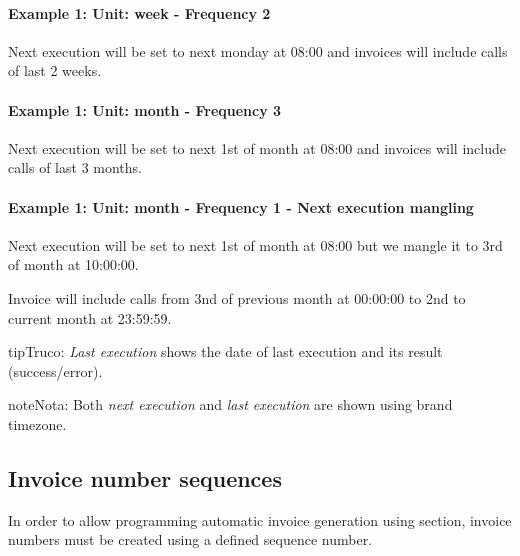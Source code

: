 \documentclass[letterpaper,10pt,spanish]{sphinxmanual}
\begin{document}
\paragraph{Example 1: Unit: week - Frequency 2}

Next execution will be set to next monday at 08:00 and invoices will include calls of last 2 weeks.
\paragraph{Example 1: Unit: month - Frequency 3}

Next execution will be set to next 1st of month at 08:00 and invoices will include calls of last 3 months.
\paragraph{Example 1: Unit: month - Frequency 1 - Next execution mangling}

Next execution will be set to next 1st of month at 08:00 but we mangle it to 3rd of month at 10:00:00.

Invoice will include calls from 3nd of previous month at 00:00:00 to 2nd to current month at 23:59:59.

\begin{notice}{tip}{Truco:}
\emph{Last execution} shows the date of last execution and its result (success/error).
\end{notice}

\begin{notice}{note}{Nota:}
Both \emph{next execution} and \emph{last execution} are shown using brand timezone.
\end{notice}


\subsection{Invoice number sequences}
\label{administration_portal/brand/invoicing/invoice_number_sequences:invoice-number-sequences}\label{administration_portal/brand/invoicing/invoice_number_sequences::doc}
In order to allow programming automatic invoice generation using {\hyperref[administration_portal/brand/invoicing/invoice_schedulers:invoice\string-schedulers]{}} section, invoice
numbers must be created using a defined sequence number.
\end{document}
